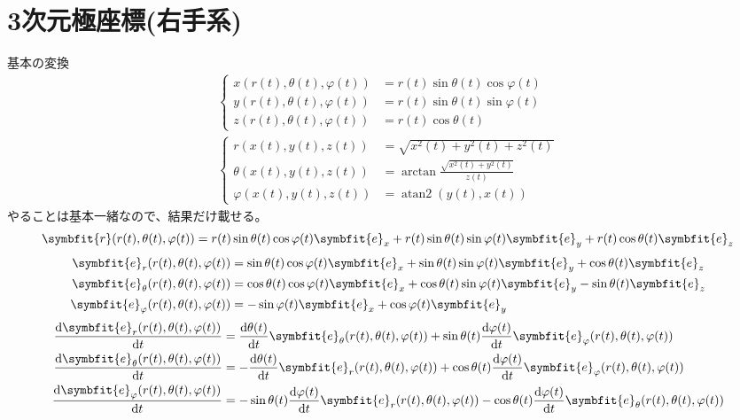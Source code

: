 \documentclass[12pt,oneside]{jlreq}
\DeclareMathOperator{\atantwo}{atan2}
\newcommand{\bm}[1]{\symbfit{#1}}
\begin{document}
\section{3次元極座標(右手系)}
基本の変換
\begin{gather*}
    \left\{
        \begin{aligned}
            x(r(t),\theta(t),\varphi(t))&=r(t)\sin\theta(t)\cos\varphi(t)\\
            y(r(t),\theta(t),\varphi(t))&=r(t)\sin\theta(t)\sin\varphi(t)\\
            z(r(t),\theta(t),\varphi(t))&=r(t)\cos\theta(t)
        \end{aligned}
    \right.\\
    \left\{
        \begin{aligned}
            r(x(t),y(t),z(t))&=\sqrt{x^2(t)+y^2(t)+z^2(t)}\\
            \theta(x(t),y(t),z(t))&=\arctan\frac{\sqrt{x^2(t)+y^2(t)}}{z(t)}\\
            \varphi(x(t),y(t),z(t))&=\atantwo\left(y(t),x(t)\right)
        \end{aligned}
    \right.
\end{gather*}
やることは基本一緒なので、結果だけ載せる。
\[
\bm{r}(r(t),\theta(t),\varphi(t))=r(t)\sin\theta(t)\cos\varphi(t)\bm{e}_x+r(t)\sin\theta(t)\sin\varphi(t)\bm{e}_y+r(t)\cos\theta(t)\bm{e}_z
\]
\begin{align*}
    \bm{e}_{r}(r(t),\theta(t),\varphi(t))&=\sin\theta(t)\cos\varphi(t)\bm{e}_x+\sin\theta(t)\sin\varphi(t)\bm{e}_y+\cos\theta(t)\bm{e}_z\\
    \bm{e}_{\theta}(r(t),\theta(t),\varphi(t))&=\cos\theta(t)\cos\varphi(t)\bm{e}_x+\cos\theta(t)\sin\varphi(t)\bm{e}_y-\sin\theta(t)\bm{e}_z\\
    \bm{e}_{\varphi}(r(t),\theta(t),\varphi(t))&=-\sin\varphi(t)\bm{e}_x+\cos\varphi(t)\bm{e}_y
\end{align*}
\begin{align*}
    \odv{\bm{e}_{r}(r(t),\theta(t),\varphi(t))}{t}&=\odv{\theta(t)}{t}\bm{e}_{\theta}(r(t),\theta(t),\varphi(t))+\sin\theta(t)\odv{\varphi(t)}{t}\bm{e}_{\varphi}(r(t),\theta(t),\varphi(t))\\
    \odv{\bm{e}_{\theta}(r(t),\theta(t),\varphi(t))}{t}&=-\odv{\theta(t)}{t}\bm{e}_{r}(r(t),\theta(t),\varphi(t))+\cos\theta(t)\odv{\varphi(t)}{t}\bm{e}_{\varphi}(r(t),\theta(t),\varphi(t))\\
    \odv{\bm{e}_{\varphi}(r(t),\theta(t),\varphi(t))}{t}&=-\sin\theta(t)\odv{\varphi(t)}{t}\bm{e}_{r}(r(t),\theta(t),\varphi(t))-\cos\theta(t)\odv{\varphi(t)}{t}\bm{e}_{\theta}(r(t),\theta(t),\varphi(t))
\end{align*}
\end{document}

